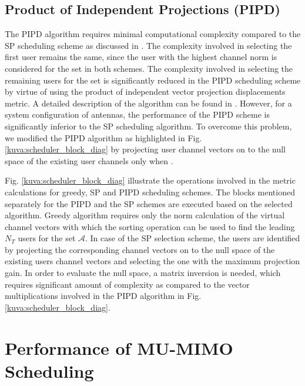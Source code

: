 \documentclass[conference,letterpaper,10pt]{./../../IEEE/IEEEtran}
\begin{document}
\subsection{Product of Independent Projections (PIPD)}
The PIPD algorithm requires minimal computational complexity compared to the SP scheduling scheme as discussed in \cite{venkatraman2014low}. The complexity involved in selecting the first user remains the same, since the user with the highest channel norm is considered for the set  in both schemes. The complexity involved in selecting the remaining users for the set  is significantly reduced in the PIPD scheduling scheme by virtue of using the product of independent vector projection displacements metric. A detailed description of the algorithm can be found in \cite{venkatraman2014low}. However, for a system configuration of  antennas, the performance of the PIPD scheme is significantly inferior to the SP scheduling algorithm. To overcome this problem, we modified the PIPD algorithm as highlighted in Fig. \ref{kuva:scheduler_block_diag} by projecting user channel vectors on to the null space of the existing user channels only when . 

Fig. \ref{kuva:scheduler_block_diag} illustrate the operations involved in the metric calculations for greedy, SP and PIPD scheduling schemes. The blocks mentioned separately for the PIPD and the SP schemes are executed based on the selected algorithm. Greedy algorithm requires only the norm calculation of the virtual channel vectors with which the sorting operation can be used to find the leading $N_T$ users for the set $\mathcal{A}$. In case of the SP selection scheme, the users are identified by projecting the corresponding channel vectors on to the null space of the existing users channel vectors and selecting the one with the maximum projection gain. In order to evaluate the null space, a matrix inversion is needed, which requires significant amount of complexity as compared to the vector multiplications involved in the PIPD algorithm in Fig. \ref{kuva:scheduler_block_diag}.

\section{Performance of MU-MIMO Scheduling}
\label{sec:perf_scheduling}
\end{document}
